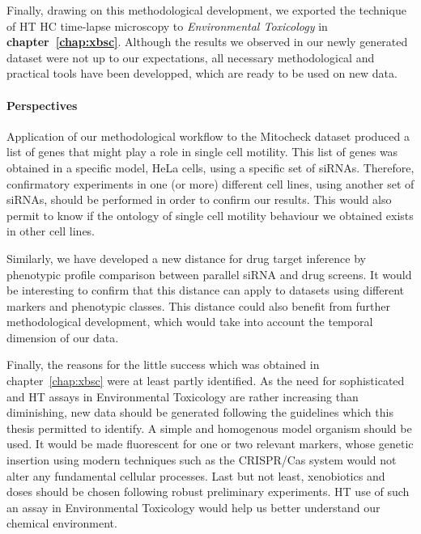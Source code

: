 Finally, drawing on this methodological development, we exported the technique of HT HC time-lapse microscopy to \textit{Environmental Toxicology} in \textbf{chapter~\ref{chap:xbsc}}. Although the results we observed in our newly generated dataset were not up to our expectations, all necessary methodological and practical tools have been developped, which are ready to be used on new data.

\paragraph*{Perspectives\\}
Application of our methodological workflow to the Mitocheck dataset produced a list of genes that might play a role in single cell motility. This list of genes was obtained in a specific model, HeLa cells, using a specific set of siRNAs. Therefore, confirmatory experiments in one (or more) different cell lines, using another set of siRNAs, should be performed in order to confirm our results. This would also permit to know if the ontology of single cell motility behaviour we obtained exists in other cell lines.

Similarly, we have developed a new distance for drug target inference by phenotypic profile comparison between parallel siRNA and drug screens. It would be interesting to confirm that this distance can apply to datasets using different markers and phenotypic classes. This distance could also benefit from further methodological development, which would take into account the temporal dimension of our data.

Finally, the reasons for the little success which was obtained in chapter~\ref{chap:xbsc} were at least partly identified. As the need for sophisticated and HT assays in Environmental Toxicology are rather increasing than diminishing, new data should be generated following the guidelines which this thesis permitted to identify. A simple and homogenous model organism should be used. It would be made fluorescent for one or two relevant markers, whose genetic insertion using modern techniques such as the CRISPR/Cas system would not alter any fundamental cellular processes. Last but not least, xenobiotics and doses should be chosen following robust preliminary experiments. HT use of such an assay in Environmental Toxicology would help us better understand our chemical environment.

